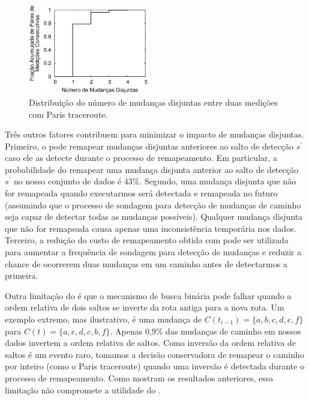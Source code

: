 \begin{figure}
\begin{center}
\includegraphics[width=0.47\textwidth]{figs/ndisjoint.eps}
\caption{Distribuição do número de mudanças disjuntas entre duas
medições com Paris traceroute.}
\label{fig:sim.ndisjoint}
\end{center}
\end{figure}

Três outros fatores contribuem para minimizar o impacto de mudanças
disjuntas.  Primeiro, o \rmprt{} pode remapear mudanças disjuntas
anteriores ao salto de detecção $s^\prime$ caso ele as detecte durante o
processo de remapeamento.  Em particular, a probabilidade do \rmprt{}
remapear uma mudança disjunta anterior ao salto de detecção $s^\prime$
no nosso conjunto de dados é 43\%.  Segundo, uma mudança disjunta que
não for remapeada quando executarmos \rmprt{} será detectada e remapeada
no futuro (assumindo que o processo de sondagem para detecção de
mudanças de caminho seja capaz de detectar todas as mudanças possíveis).
Qualquer mudança disjunta que não for remapeada causa apenas uma
inconsistência temporária nos dados.  Terceiro, a redução do custo de
remapeamento obtida com \rmprt{} pode ser utilizada para aumentar a
frequência de sondagem para detecção de mudanças e reduzir a chance de
ocorrerem duas mudanças em um caminho antes de detectarmos a primeira.

Outra limitação do \rmprt{} é que o mecanismo de busca binária pode
falhar quando a ordem relativa de dois saltos se inverte da rota antiga
para a nova rota.  Um exemplo extremo, mas ilustrativo, é uma mudança de
$C(t_{i-1}) = \{a, b, c, d, e, f\}$ para $C(t) = \{a, e, d, c, b, f\}$.
Apenas 0,9\% das mudanças de caminho em nossos dados invertem a ordem
relativa de saltos.  Como inversão da ordem relativa de saltos é um
evento raro, tomamos a decisão conservadora de remapear o caminho por
inteiro (como o Paris traceroute) quando uma inversão é detectada
durante o processo de remapeamento.  Como mostram os resultados
anteriores, essa limitação não compromete a utilidade do \rmprt{}.
